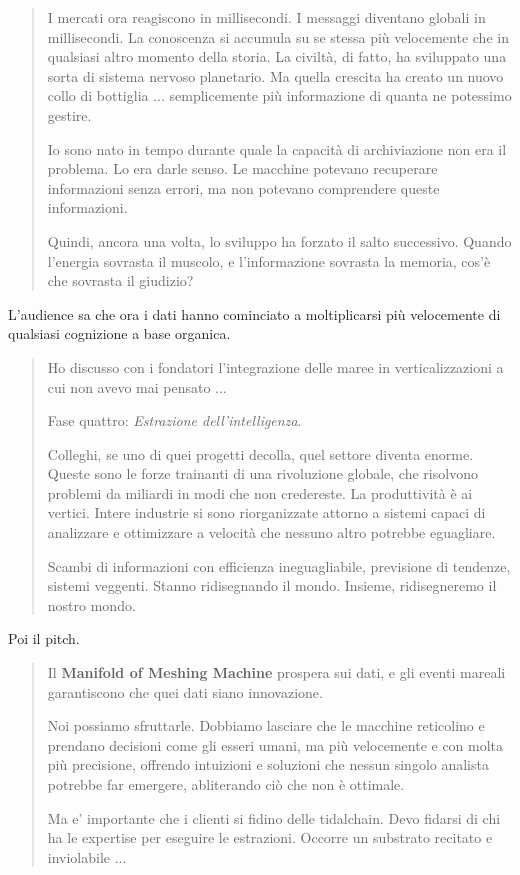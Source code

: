 \begin{quote}
I mercati ora reagiscono in millisecondi. I messaggi diventano globali in millisecondi. La conoscenza si accumula su se stessa più velocemente che in qualsiasi altro momento della storia. La civiltà, di fatto, ha sviluppato una sorta di sistema nervoso planetario. Ma quella crescita ha creato un nuovo collo di bottiglia ... semplicemente più informazione di quanta ne potessimo gestire.

Io sono nato in tempo durante quale la capacità di archiviazione non era il problema. Lo era darle senso. Le macchine potevano recuperare informazioni senza errori, ma non potevano comprendere queste informazioni. 

Quindi, ancora una volta, lo sviluppo ha forzato il salto successivo. Quando l'energia sovrasta il muscolo, e l'informazione sovrasta la memoria, cos'è che sovrasta il giudizio?

\end{quote}

L'audience sa che ora i dati hanno cominciato a moltiplicarsi più velocemente di qualsiasi cognizione a base organica.

\begin{quote}

Ho discusso con i fondatori l'integrazione delle maree in verticalizzazioni a cui non avevo mai pensato ...

Fase quattro: \textit{Estrazione dell'intelligenza}.

Colleghi, se uno di quei progetti decolla, quel settore diventa enorme. Queste sono le forze trainanti di una rivoluzione globale, che risolvono problemi da miliardi in modi che non credereste. La produttività è ai vertici. Intere industrie si sono riorganizzate attorno a sistemi capaci di analizzare e ottimizzare a velocità che nessuno altro potrebbe eguagliare.

Scambi di informazioni con efficienza ineguagliabile, previsione di tendenze, sistemi veggenti. Stanno ridisegnando il mondo. Insieme, ridisegneremo il nostro mondo.

\end{quote}


Poi il pitch.

\begin{quote}

Il \color{nullmesh-accent}\sffamily\small\textbf{Manifold of Meshing Machine} prospera sui dati, e gli eventi mareali garantiscono che quei dati siano innovazione.

Noi possiamo sfruttarle. Dobbiamo lasciare che le macchine reticolino e prendano decisioni come gli esseri umani, ma più velocemente e con molta più precisione, offrendo intuizioni e soluzioni che nessun singolo analista potrebbe far emergere, abliterando ciò che non è ottimale.

Ma e' importante che i clienti si fidino delle tidalchain. Devo fidarsi di chi ha le expertise per eseguire le estrazioni. Occorre un substrato recitato e inviolabile ... 
\end{quote}

